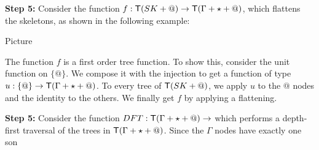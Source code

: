 \medskip
\noindent \textbf{Step 5:} Consider the function $f:\mathsf T(SK+@)\to\mathsf T(\Gamma+\star+@)$, which flattens the skeletons, as shown in the following example:
\begin{center}
Picture
\end{center}
The function $f$ is a first order tree function. To show this, consider the unit function on 
$\{@\}$. We compose it with the injection to get a function of type $u:\{@\}\to \mathsf T(\Gamma+\star+@)$.  To every tree of $\mathsf T(SK+@)$, we apply $u$ to the $@$ nodes and the identity to the others. We finally get $f$ by applying a flattening.

\medskip
\noindent \textbf{Step 5:} Consider the function $DFT: \mathsf T(\Gamma+\star+@)\to $ which performs a depth-first traversal of the trees in $\mathsf T(\Gamma+\star+@)$. Since the $\Gamma$ nodes have exactly one son 